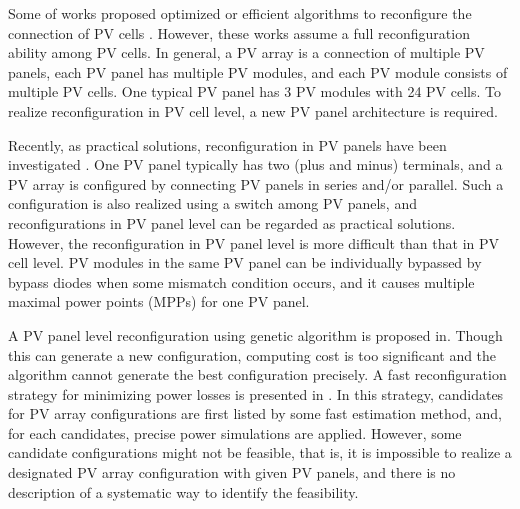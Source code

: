 \documentclass[conference]{IEEEtran}
\begin{document}
Some of works proposed optimized or efficient algorithms to reconfigure the connection of PV cells \cite{b3}\cite{b4}. However, these works assume a full reconfiguration ability among PV cells. In general, a PV array is a connection of multiple PV panels, each PV panel has multiple PV modules, and each PV module consists of multiple PV cells. One typical PV panel has 3 PV modules with 24 PV cells. To realize reconfiguration in PV cell level, a new PV panel architecture is required.

Recently, as practical solutions, reconfiguration in PV panels have been investigated \cite{b5}\cite{b10}. One PV panel typically has two (plus and minus) terminals, and a PV array is configured by connecting PV panels in series and/or parallel. Such a configuration is also realized using a switch among PV panels, and reconfigurations in PV panel level can be regarded as  practical solutions. However, the reconfiguration in PV panel level is more difficult than that in PV cell level. PV modules in the same PV panel can be individually bypassed by bypass diodes when some mismatch condition occurs, and it causes multiple maximal power points (MPPs) for one PV panel.  

A PV panel level reconfiguration using genetic algorithm is proposed in\cite{b5}. Though this can generate a new configuration, 
computing cost is too significant and the algorithm cannot generate the best configuration precisely. A fast reconfiguration
strategy for minimizing power losses is presented in \cite{b10}.
In this strategy, candidates for PV array configurations are first listed by some fast estimation method, and, for each candidates, precise power simulations are applied. However, some candidate configurations might not be feasible, that is, it is impossible to realize a designated PV array configuration with given PV panels, and there is no description of a systematic way to identify the feasibility. 
\end{document}
